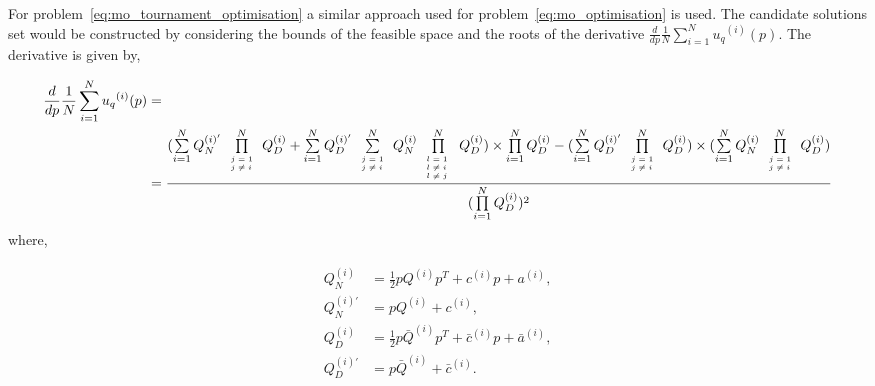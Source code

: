 \documentclass[10pt]{article}
\begin{document}
For  problem~\ref{eq:mo_tournament_optimisation} a similar approach used for 
problem~\ref{eq:mo_optimisation} is used. The candidate
solutions set would be constructed by considering the bounds of the feasible space
and the roots of the derivative \(\frac{d}{dp} \frac{1}{N} \sum\limits_{i=1} ^ {N} {u_q}^{(i)} (p)\).
The derivative is given by,

{\scriptsize
\begin{align}\label{eq:mo_tournament_derivative}
    \frac{d}{dp} \frac{1}{N} \sum\limits_{i=1} ^ {N} {u_q}^{(i)} (p) & = \nonumber \\
    & =\frac{
    (\sum\limits_{i=1} ^ {N} Q_{N}^{(i)'} \prod\limits_{\tiny\begin{array}{l} j=1 \\ j \neq i \end{array}} ^ N Q_{D}^{(i)}
    + \sum\limits_{i=1} ^ {N} Q_{D}^{(i)'} \sum\limits_{\tiny\begin{array}{l} j=1 \\ j \neq i \end{array}} ^ {N} Q_{N}^{(i)}
    \prod\limits_{\tiny\begin{array}{l} l=1 \\ l \neq i \ \\ l \neq j \end{array}} ^ N Q_{D}^{(i)}) \times
    \prod\limits_{i=1} ^ N Q_{D}^{(i)} - (\sum\limits_{i=1} ^ {N} Q_{D}^{(i)'}
    \prod\limits_{\tiny\begin{array}{l} j=1 \\ j \neq i \end{array}} ^ N Q_{D}^{(i)}) \times 
    (\sum\limits_{i=1} ^ {N} Q_{N}^{(i)} \prod\limits_{\tiny\begin{array}{l} j=1 \\ j \neq i \end{array}} ^ N Q_{D}^{(i)})}
    {(\prod\limits_{i=1} ^ N Q_{D}^{(i)})^{2}}
\end{align}
}
where,

\begin{align*}
    Q_{N}^{(i) } & = \frac{1}{2} pQ^{(i)} p^T + c^{(i)} p + a^ {(i)}, \\
    Q_{N}^{(i)'} & =  pQ^{(i)} + c^{(i)}, \\
    Q_{D}^{(i) } & = \frac{1}{2} p\bar{Q}^{(i)} p^T + \bar{c}^{(i)} p + \bar{a}^ {(i)}, \\
    Q_{D}^{(i)'} & =  p\bar{Q}^{(i)} + \bar{c}^{(i)}. \\
\end{align*}
\end{document}

